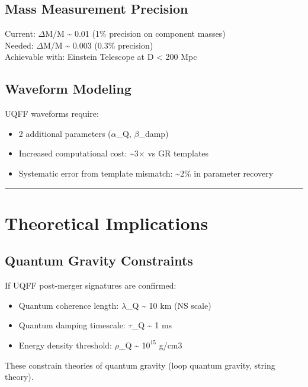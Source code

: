 \documentclass[12pt,a4paper]{article}
\begin{document}
\subsection{Mass Measurement Precision}

Current: $\Delta$M/M \textasciitilde{} 0.01 (1\% precision on component masses) \\  Needed: $\Delta$M/M \textasciitilde{} 0.003 (0.3\% precision) \\  Achievable with: Einstein Telescope at D < 200 Mpc

\subsection{Waveform Modeling}

UQFF waveforms require:

\begin{itemize}
  \item 2 additional parameters ($\alpha$\_Q, $\beta$\_damp)
  \item Increased computational cost: \textasciitilde{}3$\times$ vs GR templates
  \item Systematic error from template mismatch: \textasciitilde{}2\% in parameter recovery
\end{itemize}

\medskip\hrule\medskip

\section{Theoretical Implications}

\subsection{Quantum Gravity Constraints}

If UQFF post-merger signatures are confirmed:

\begin{itemize}
  \item Quantum coherence length: $\lambda$\_Q \textasciitilde{} 10 km (NS scale)
  \item Quantum damping timescale: $\tau$\_Q \textasciitilde{} 1 ms
  \item Energy density threshold: $\rho$\_Q \textasciitilde{} 1$0^{15}$ g/cm3
\end{itemize}

These constrain theories of quantum gravity (loop quantum gravity, string theory).
\end{document}
